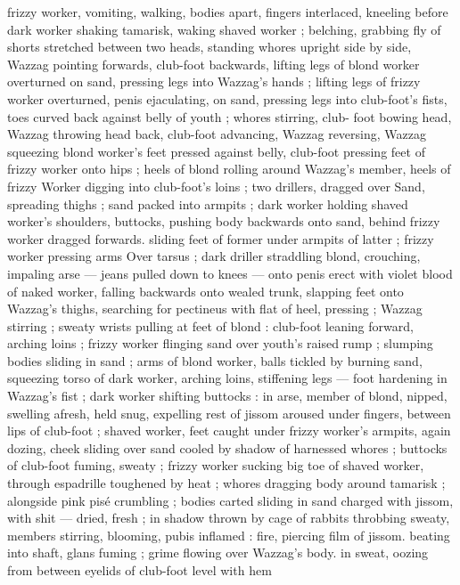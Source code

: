 {frizzy worker, vomiting, walking, bodies apart, fingers interlaced, 
kneeling before dark worker shaking tamarisk, waking shaved worker 
; belching, grabbing fly of shorts stretched between two heads, 
standing whores upright side by side, Wazzag pointing forwards, 
club-foot backwards, lifting legs of blond worker overturned on 
sand, pressing legs into Wazzag's hands ; lifting legs of frizzy worker 
overturned, penis ejaculating, on sand, pressing legs into club-foot's 
fists, toes curved back against belly of youth ; whores stirring, club- 
foot bowing head, Wazzag throwing head back, club-foot advancing, 
Wazzag reversing, Wazzag squeezing blond worker's feet pressed 
against belly, club-foot pressing feet of frizzy worker onto hips ; 
heels of blond rolling around Wazzag's member, heels of frizzy 
Worker digging into club-foot's loins ; two drillers, dragged over 
Sand, spreading thighs ; sand packed into armpits ; dark worker 
holding shaved worker's shoulders, buttocks, pushing body 
backwards onto sand, behind frizzy worker dragged forwards. sliding 
feet of former under armpits of latter ; frizzy worker pressing arms 
Over tarsus ; dark driller straddling blond, crouching, impaling arse 
--- jeans pulled down to knees --- onto penis erect with violet blood 
of naked worker, falling backwards onto wealed trunk, slapping feet 
onto Wazzag's thighs, searching for pectineus with flat of heel, 
pressing ; Wazzag stirring ; sweaty wrists pulling at feet of blond : 
club-foot leaning forward, arching loins ; frizzy worker flinging sand 
over youth's raised rump ; slumping bodies sliding in sand ; arms of 
blond worker, balls tickled by burning sand, squeezing torso of dark 
worker, arching loins, stiffening legs --- foot hardening in Wazzag's 
fist ; dark worker shifting buttocks : in arse, member of blond, 
nipped, swelling afresh, held snug, expelling rest of jissom aroused 
under fingers, between lips of club-foot ; shaved worker, feet caught 
under frizzy worker's armpits, again dozing, cheek sliding over sand 
cooled by shadow of harnessed whores ; buttocks of club-foot 
fuming, sweaty ; frizzy worker sucking big toe of shaved worker, 
through espadrille toughened by heat ; whores dragging body 
around tamarisk ; alongside pink pisé crumbling ; bodies carted 
sliding in sand charged with jissom, with shit --- dried, fresh ; in 
shadow thrown by cage of rabbits throbbing sweaty, members 
stirring, blooming, pubis inflamed : fire, piercing film of jissom. 
beating into shaft, glans fuming ; grime flowing over Wazzag's body. 
in sweat, oozing from between eyelids of club-foot level with hem 
}
